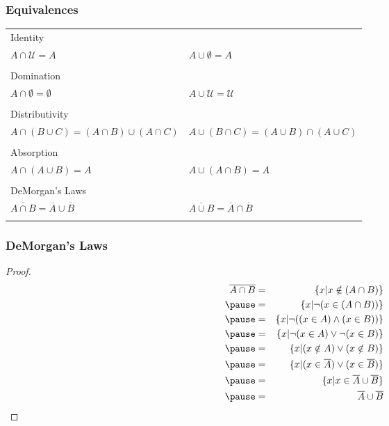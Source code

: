 \documentclass[dvipsnames]{beamer}
\begin{document}
\begin{frame}
  \frametitle{Equivalences}

  \begin{tabular}{ll}
    \alert{Identity} &\\
      $A \cap \mathcal{U} = A$ &
      $A \cup \emptyset = A$\\\\
    \pause
    \alert{Domination} &\\
      $A \cap \emptyset = \emptyset$ &
      $A \cup \mathcal{U} = \mathcal{U}$\\\\
    \pause
    \alert{Distributivity} &\\
      $A \cap (B \cup C) = (A \cap B) \cup (A \cap C)$ &
      $A \cup (B \cap C) = (A \cup B) \cap (A \cup C)$\\\\
    \pause
    \alert{Absorption} &\\
      $A \cap (A \cup B) = A$ &
      $A \cup (A \cap B) = A$\\\\
    \pause
    \alert{DeMorgan's Laws} &\\
      $\overline{A \cap B} = \overline{A} \cup \overline{B}$ &
      $\overline{A \cup B} = \overline{A} \cap \overline{B}$\\\\
  \end{tabular}
\end{frame}

\begin{frame}
  \frametitle{DeMorgan's Laws}

  \begin{proof}
    \begin{eqnarray*}
      \overline{A \cap B} & = & \{x | x \notin (A \cap B)\}\\\pause
                          & = & \{x | \neg (x \in (A \cap B))\}\\\pause
                          & = & \{x | \neg ((x \in A) \wedge (x \in B))\}\\\pause
                          & = & \{x | \neg (x \in A) \vee \neg (x \in B)\}\\\pause
                          & = & \{x | (x \notin A) \vee (x \notin B)\}\\\pause
                          & = & \{x | (x \in \overline{A}) \vee (x \in \overline{B})\}\\\pause
                          & = & \{x | x \in \overline{A} \cup \overline{B}\}\\\pause
                          & = & \overline{A} \cup \overline{B}
    \end{eqnarray*}
  \end{proof}
\end{frame}
\end{document}
